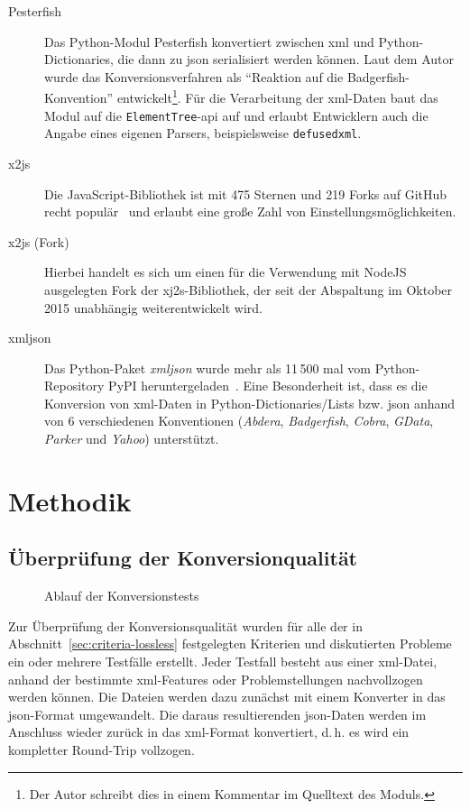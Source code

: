 \begin{description}
    \item[Pesterfish] Das Python-Modul Pesterfish konvertiert zwischen \acrshort{xml} und Python-\linebreak{}Dictionaries, die dann zu \acrshort{json} serialisiert werden können. Laut dem Autor wurde das Konversionsverfahren als \enquote{Reaktion auf die Badgerfish-Konvention} entwickelt\footnote{Der Autor schreibt dies in einem Kommentar im Quelltext des Moduls.}. Für die Verarbeitung der \acrshort{xml}-Daten baut das Modul auf die \texttt{ElementTree}-\acrshort{api} auf und erlaubt Entwicklern auch die Angabe eines eigenen Parsers, beispielsweise \texttt{defusedxml}.
    \item[x2js] Die JavaScript-Bibliothek ist mit 475 Sternen und 219 Forks auf GitHub recht populär~\cite{githubx2js} und erlaubt eine große Zahl von Einstellungsmöglichkeiten.
    \item[x2js (Fork)] Hierbei handelt es sich um einen für die Verwendung mit NodeJS ausgelegten Fork der xj2s-Bibliothek, der seit der Abspaltung im Oktober 2015 unabhängig weiterentwickelt wird.
    \item[xmljson] Das Python-Paket \emph{xmljson} wurde mehr als 11\,500 mal vom Python-Repository PyPI heruntergeladen~\cite{pypistats-xmljson}. Eine Besonderheit ist, dass es die Konversion von \acrshort{xml}-Daten in Python-Dictionaries/Lists bzw. \acrshort{json} anhand von 6 verschiedenen Konventionen (\emph{Abdera}, \emph{Badgerfish}, \emph{Cobra}, \emph{GData}, \emph{Parker} und \emph{Yahoo}) unterstützt.
\end{description}


\section{Methodik}
\label{sec:method}

\subsection{Überprüfung der Konversionqualität}
\label{sec:method-conv}

\begin{figure}[bp!]
    \begin{center}
        
        \caption{Ablauf der Konversionstests}
    \end{center}
\end{figure}

Zur Überprüfung der Konversionsqualität wurden für alle der in Abschnitt~\ref{sec:criteria-lossless} festgelegten Kriterien und diskutierten Probleme ein oder mehrere Testfälle erstellt. Jeder Testfall besteht aus einer \acrshort{xml}-Datei, anhand der bestimmte \acrshort{xml}-Features oder Problemstellungen nachvollzogen werden können. Die Dateien werden dazu zunächst mit einem Konverter in das \acrshort{json}-Format umgewandelt. Die daraus resultierenden \acrshort{json}-Daten werden im Anschluss wieder zurück in das \acrshort{xml}-Format konvertiert, d.\,h. es wird ein kompletter Round-Trip vollzogen.

